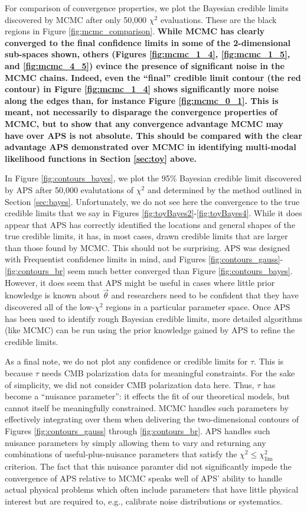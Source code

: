 \documentclass[useAMS,usenatbib]{aastex}
\begin{document}
For comparison of convergence properties, we plot the Bayesian credible limits discovered
by MCMC after only 50,000 $\chi^2$ evaluations.  These are the black regions in
Figure \ref{fig:mcmc_comparison}.  
{\bf %
While MCMC has clearly converged to the final
confidence limits in some of the 2-dimensional sub-spaces shown,
others (Figures \ref{fig:mcmc_1_4}, \ref{fig:mcmc_1_5}, and \ref{fig:mcmc_4_5})
evince the presence of significant noise in the MCMC chains.
Indeed, even the ``final'' credible limit contour (the red contour) in Figure
\ref{fig:mcmc_1_4} shows significantly more noise along the edges than, for instance
Figure \ref{fig:mcmc_0_1}.  This is meant, not necessarily to disparage the convergence
properties of MCMC, but to show that any convergence advantage MCMC may have over APS is
not absolute.  This should be compared with the clear advantage APS demonstrated over 
MCMC in identifying multi-modal likelihood functions in Section \ref{sec:toy} above.
} %

In Figure \ref{fig:contours_bayes}, we plot the 95\% Bayesian credible limit discovered
by APS after 50,000 evalutations of $\chi^2$ and determined by the method outlined in
Section \ref{sec:bayes}.  Unfortunately, we do not see here the convergence to the true
credible limits that we say in Figures \ref{fig:toyBayes2}-\ref{fig:toyBayes4}.  While
it does appear that APS has correctly identified the locations and general shapes of the
true credible limits, it has, in most cases, drawn credible limits that are larger than
those found by MCMC.  This should not be surprising.  APS was designed with Frequentist
confidence limits in mind, and Figures \ref{fig:contours_gauss}-\ref{fig:contours_br}
seem much better converged than Figure \ref{fig:contours_bayes}.  However, it does seem
that APS might be useful in cases where little prior knowledge is known about $\vec{\theta}$
and researchers need to be confident that they have discovered all of the low-$\chi^2$
regions in a particular parameter space.  Once APS has been used to identify rough
Bayesian credible limits, more detailed algorithms (like MCMC) can be run using the prior
knowledge gained by APS to refine the credible limits.

As a final note, we do not plot any confidence or 
credible limits for $\tau$.
This is because $\tau$ needs CMB polarization data for meaningful constraints.  For the sake
of simplicity, we did not consider CMB polarization data here.  Thus, $\tau$ has become a
``nuisance parameter'': it effects the fit of our theoretical models, but cannot itself be
meaningfully constrained.  MCMC handles such parameters by effectively integrating over them
when delivering the two-dimensional contours of Figures
\ref{fig:contours_gauss} through \ref{fig:contours_br}.  
APS handles such nuisance parameters by
simply allowing them to vary and returning any combinations of useful-plus-nuisance parameters
that satisfy the $\chi^2\le\chi^2_\text{lim}$ criterion.  The fact that this nuisance
paramter did not significantly impede the convergence of APS relative to MCMC speaks 
well of
APS' ability to handle actual physical problems which 
often include parameters that have
little physical interest but are required to, e.g., 
calibrate noise distributions or
systematics.
\end{document}

